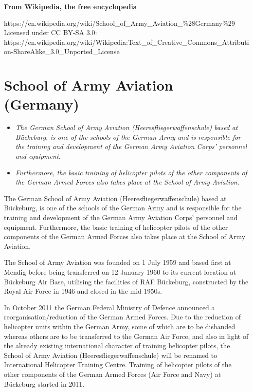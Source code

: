 \textbf{From Wikipedia, the free encyclopedia}

https://en.wikipedia.org/wiki/School\_of\_Army\_Aviation\_\%28Germany\%29\\
Licensed under CC BY-SA 3.0:\\
https://en.wikipedia.org/wiki/Wikipedia:Text\_of\_Creative\_Commons\_Attribution-ShareAlike\_3.0\_Unported\_License

\section{School of Army Aviation
(Germany)}\label{school-of-army-aviation-germany}

\begin{itemize}
\item
  \emph{The German School of Army Aviation (Heeresfliegerwaffenschule)
  based at Bückeburg, is one of the schools of the German Army and is
  responsible for the training and development of the German Army
  Aviation Corps' personnel and equipment.}
\item
  \emph{Furthermore, the basic training of helicopter pilots of the
  other components of the German Armed Forces also takes place at the
  School of Army Aviation.}
\end{itemize}

The German School of Army Aviation (Heeresfliegerwaffenschule) based at
Bückeburg, is one of the schools of the German Army and is responsible
for the training and development of the German Army Aviation Corps'
personnel and equipment. Furthermore, the basic training of helicopter
pilots of the other components of the German Armed Forces also takes
place at the School of Army Aviation.

The School of Army Aviation was founded on 1 July 1959 and based first
at Mendig before being transferred on 12 January 1960 to its current
location at Bückeburg Air Base, utilising the facilities of RAF
Bückeburg, constructed by the Royal Air Force in 1946 and closed in the
mid-1950s.

In October 2011 the German Federal Ministry of Defence announced a
reorganisation/reduction of the German Armed Forces. Due to the
reduction of helicopter units within the German Army, some of which are
to be disbanded whereas others are to be transferred to the German Air
Force, and also in light of the already existing international character
of training helicopter pilots, the School of Army Aviation
(Heeresfliegerwaffenschule) will be renamed to International Helicopter
Training Centre. Training of helicopter pilots of the other components
of the German Armed Forces (Air Force and Navy) at Bückeburg started in
2011.

